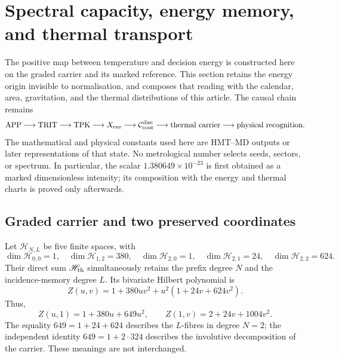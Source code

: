 \section{Spectral capacity, energy memory, and thermal transport}
\label{v:sec:capacidad-espectral-termica}

The positive map between temperature and decision energy is constructed here
on the graded carrier and its marked reference. This section retains the
energy origin invisible to
normalisation, and composes that reading with the calendar, area, gravitation,
and the thermal distributions of this article. The causal chain remains
\[
 \mathrm{APP}\longrightarrow\mathrm{TRIT}\longrightarrow\mathrm{TPK}
 \longrightarrow X_{\rm enr}
 \longrightarrow\mathcal C_{\rm cont}^{\rm disc}
 \longrightarrow\text{thermal carrier}
 \longrightarrow\text{physical recognition}.
\]
The mathematical and physical constants used here are HMT--MD outputs or
later representations of that state. No metrological number selects seeds,
sectors, or spectrum. In particular, the scalar
$1.380649\times10^{-23}$ is first obtained as a marked dimensionless
intensity; its composition with the energy and thermal charts is proved only
afterwards.

\subsection{Graded carrier and two preserved coordinates}

Let $\mathscr H_{N,L}$ be five finite spaces, with
\begin{equation}
 \dim\mathscr H_{0,0}=1,\quad
 \dim\mathscr H_{1,2}=380,\quad
 \dim\mathscr H_{2,0}=1,\quad
 \dim\mathscr H_{2,1}=24,\quad
 \dim\mathscr H_{2,2}=624.
 \label{v:eq:fibras-termicas-NL}
\end{equation}
Their direct sum $\mathscr H_{\rm th}$ simultaneously retains the prefix
degree $N$ and the incidence-memory degree $L$. Its bivariate Hilbert
polynomial is
\begin{equation}
 Z(u,v)=1+380uv^2+u^2(1+24v+624v^2).
 \label{v:eq:polinomio-graduado-termico}
\end{equation}
Thus,
\[
 Z(u,1)=1+380u+649u^2,\qquad
 Z(1,v)=2+24v+1004v^2.
\]
The equality $649=1+24+624$ describes the $L$-fibres in degree $N=2$;
the independent identity $649=1+2\cdot324$ describes the involutive
decomposition of the carrier. These meanings are not interchanged.


